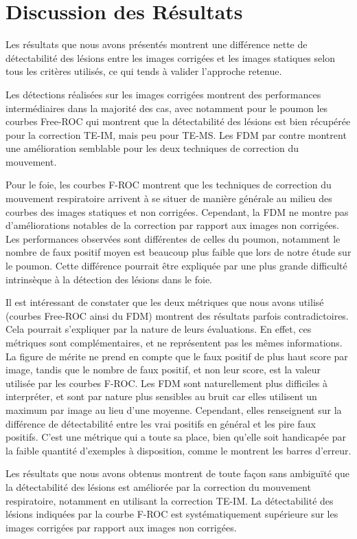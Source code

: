 \section{Discussion des Résultats}

Les résultats que nous avons présentés montrent une différence nette de détectabilité des lésions entre les images corrigées et les images statiques selon tous les critères utilisés, ce qui tends à valider l'approche retenue.

Les détections réalisées sur les images corrigées montrent des performances intermédiaires dans la majorité des cas, avec notamment pour le poumon les courbes Free-ROC qui montrent que la détectabilité des lésions est bien récupérée pour la correction TE-IM, mais peu pour TE-MS. Les FDM par contre montrent une amélioration semblable pour les deux techniques de correction du mouvement. 

Pour le foie, les courbes F-ROC montrent que les techniques de correction du mouvement respiratoire arrivent à se situer de manière générale au milieu des courbes des images statiques et non corrigées. Cependant, la FDM ne montre pas d'améliorations notables de la correction par rapport aux images non corrigées. Les performances observées sont différentes de celles du poumon, notamment le nombre de faux positif moyen est beaucoup plus faible que lors de notre étude sur le poumon. Cette différence pourrait être expliquée par une plus grande difficulté intrinsèque à la détection des lésions dans le foie.

Il est intéressant de constater que les deux métriques que nous avons utilisé (courbes Free-ROC ainsi du FDM) montrent des résultats parfois contradictoires. Cela pourrait s'expliquer par la nature de leurs évaluations. En effet, ces métriques sont complémentaires, et ne représentent pas les mêmes informations. La figure de mérite ne prend en compte que le faux positif de plus haut score par image, tandis que le nombre de faux positif, et non leur score, est la valeur utilisée par les courbes F-ROC. Les FDM sont naturellement plus difficiles à interpréter, et sont par nature plus sensibles au bruit car  elles utilisent un maximum par image au lieu d’une moyenne. Cependant, elles renseignent sur la différence de détectabilité entre les vrai  positifs en général et les pire faux positifs. C’est une métrique qui a toute sa place, bien qu’elle soit handicapée par la faible  quantité d’exemples à disposition, comme le montrent les barres d’erreur.

Les résultats que nous avons obtenus montrent de toute façon sans ambiguïté que la détectabilité des lésions est améliorée par la correction du mouvement respiratoire, notamment en utilisant la correction TE-IM. La détectabilité des lésions indiquées par la courbe F-ROC est systématiquement supérieure sur les images corrigées par rapport aux images non corrigées.

